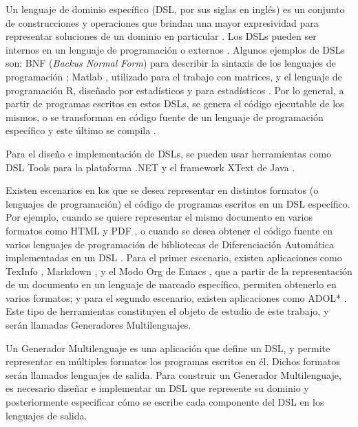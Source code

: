 \begin{introduction}
  
Un lenguaje de dominio específico (DSL, por sus siglas en ingl\'es) es un conjunto de construcciones y operaciones que brindan una mayor expresividad para representar soluciones de un dominio en particular \cite{dslEngineering}. Los DSLs pueden ser internos en un lenguaje de programaci\'on o externos \cite{dsl1}. Algunos ejemplos de DSLs son: BNF (\textit{Backus Normal Form}) para describir la sintaxis de los lenguajes de programaci\'on \cite{BFN}; Matlab \cite{matlab}, utilizado para el trabajo con matrices, y el lenguaje de programaci\'on R, diseñado por estad\'isticos y para estad\'isticos \cite{R}. Por lo general, a partir de programas escritos en estos DSLs, se genera el código ejecutable de los mismos, o se transforman en código fuente de un lenguaje de programación específico y este último se compila \cite{dslEngineering} \cite{implementations_DSL} \cite{dsl1}. 

Para el diseño e implementaci\'on de DSLs, se pueden usar herramientas como {DSL Tools} para la plataforma .NET \cite{dsltools} y el framework XText de Java \cite{xtext}. 

Existen escenarios en los que se desea representar en distintos formatos (o lenguajes de programación) el código de programas escritos en un DSL específico. Por ejemplo, cuando se quiere representar el mismo documento en varios formatos como HTML \cite{HTML} y PDF \cite{pdf}, o cuando se desea obtener el código fuente en varios lenguajes de programación de bibliotecas de Diferenciación Automática implementadas en un DSL \cite{Da}. Para el primer escenario, existen aplicaciones como TexInfo \cite{texinfo}, {Markdown} \cite{markdown}, y el Modo Org de Emacs \cite{emacs}, que a partir de la representación de un documento en un lenguaje de marcado específico,  permiten obtenerlo en varios formatos; y para el segundo escenario, existen aplicaciones como ADOL* \cite{Adol*}. Este tipo de herramientas constituyen el objeto de estudio de este trabajo, y serán llamadas Generadores Multilenguajes.

Un Generador Multilenguaje es una aplicación que define un DSL, y permite representar en múltiples formatos los programas escritos en \'el. Dichos  formatos serán llamados lenguajes de salida. Para construir un Generador Multilenguaje, es necesario diseñar e implementar un DSL que represente su dominio y posteriormente especificar c\'omo se escribe cada componente del DSL en los lenguajes de salida.


\end{introduction}
